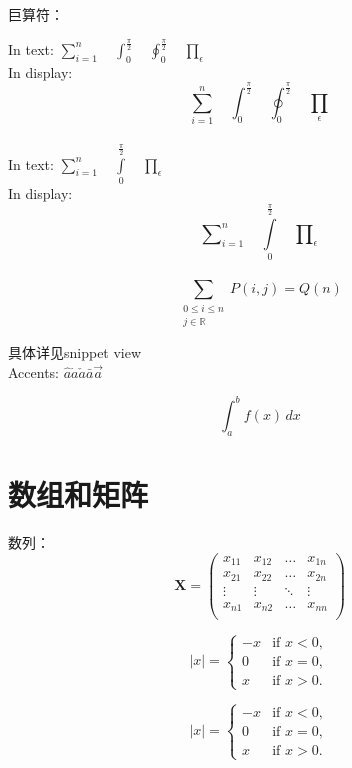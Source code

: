 \documentclass[10pt,a4paper,twocolumn]{book}
\begin{document}
巨算符：

In text: $\sum_{i=1}^n \quad
 \int_0^{\frac{\pi}{2}} \quad
 \oint_0^{\frac{\pi}{2}} \quad 
 \prod_\epsilon $ \\
In display: \[\sum_{i=1}^n \quad 
\int_0^{\frac{\pi}{2}} \quad 
\oint_0^{\frac{\pi}{2}} \quad 
\prod_\epsilon \]
\\[5pt]
In text: $\sum\limits_{i=1}^n \quad 
\int\limits_0^{\frac{\pi}{2}} \quad 
\prod\limits_\epsilon $ \\
In display: \[\sum\nolimits_{i=1}^n \quad 
\int\limits_0^{\frac{\pi}{2}} \quad 
\prod\nolimits_\epsilon \]
\\[5pt]
\[
\sum_{\substack{0\le i\le n \\
j\in \mathbb{R}}}
P(i,j) = Q(n) \]

具体详见snippet view\\
Accents:
$\hat{a} \dot{a} \check{a} \bar{a} \vec{a} $

\[\int_{a}^{b} f(x) \,dx \]

\section{数组和矩阵}

数列：\\
\[ \mathbf{X} = \left(
\begin{array}{cccc} 
    x_{11} & x_{12} & \ldots & x_{1n}\\
    x_{21} & x_{22} & \ldots & x_{2n}\\
    \vdots & \vdots & \ddots & \vdots\\
    x_{n1} & x_{n2} & \ldots & x_{nn}\\
\end{array} \right) \]

\[ |x| = \left\{ \begin{array}{rl}
-x & \text{if } x < 0,\\
 0 & \text{if } x = 0,\\
  x & \text{if } x > 0. 
\end{array} \right. \]

\[ |x| = \begin{cases}
 -x & \text{if } x < 0,\\
  0 & \text{if } x = 0,\\
   x & \text{if } x > 0. 
\end{cases} \]
\end{document}
